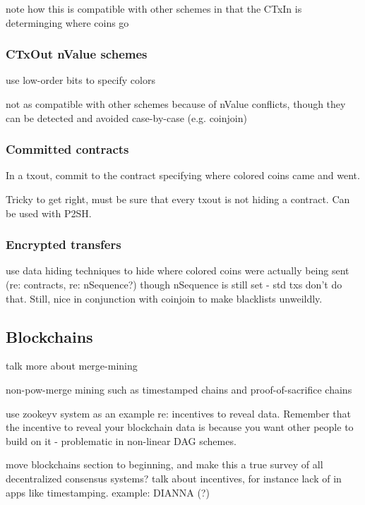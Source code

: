 \documentclass{article}
\begin{document}
note how this is compatible with other schemes in that the CTxIn is determinging where coins go


\subsubsection{CTxOut nValue schemes}

use low-order bits to specify colors

not as compatible with other schemes because of nValue conflicts, though they
can be detected and avoided case-by-case (e.g. coinjoin)



\subsubsection{Committed contracts}

In a txout, commit to the contract specifying where colored coins came and went.

Tricky to get right, must be sure that every txout is not hiding a contract.
Can be used with P2SH.


\subsubsection{Encrypted transfers}

use data hiding techniques to hide where colored coins were actually being sent
(re: contracts, re: nSequence?) though nSequence is still set - std txs don't
do that. Still, nice in conjunction with coinjoin to make blacklists unweildly.



\subsection{Blockchains}

talk more about merge-mining

non-pow-merge mining such as timestamped chains and proof-of-sacrifice chains

use zookeyv system as an example re: incentives to reveal data. Remember that
the incentive to reveal your blockchain data is because you want other people
to build on it - problematic in non-linear DAG schemes.

move blockchains section to beginning, and make this a true survey of all
decentralized consensus systems? talk about incentives, for instance lack of in
apps like timestamping. example: DIANNA (?)
\end{document}
